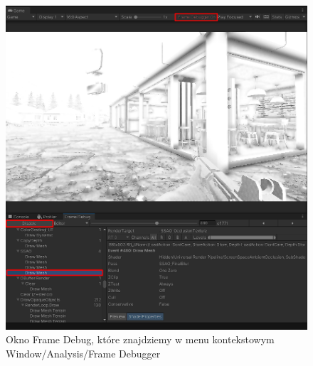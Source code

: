 \begin{itemize}
\begin{figure}[h]
        \includegraphics[width=1\linewidth]{Images/frameDebugger.png}
        \caption{Okno Frame Debug, które znajdziemy w menu kontekstowym Window/Analysis/Frame Debugger}
    \end{figure}
    \FloatBarrier
\end{itemize}